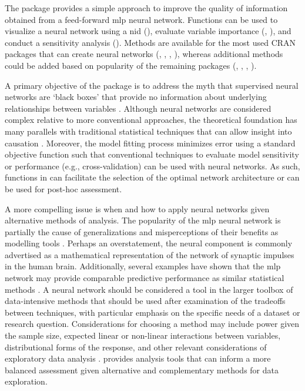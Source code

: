 \documentclass[article,shortnames]{jss}
\begin{document}
The  package provides a simple approach to improve the quality of information obtained from a feed-forward \ac{mlp} neural network.  Functions can be used to visualize a neural network using a \acl{nid} (), evaluate variable importance (, ), and conduct a sensitivity analysis ().  Methods are available for the most used \ac{CRAN} packages that can create neural networks (, , , ), whereas additional methods could be added based on popularity of the remaining packages (, , , ).  

A primary objective of the package is to address the myth that supervised neural networks are `black boxes' that provide no information about underlying relationships between variables \citep{Paruelo97,Olden02}.  Although neural networks are considered complex relative to more conventional approaches, the theoretical foundation has many parallels with traditional statistical techniques that can allow insight into causation \citep{Cheng94}.  Moreover, the model fitting process minimizes error using a standard objective function such that conventional techniques to evaluate model sensitivity or performance (e.g., cross-validation) can be used with neural networks.  As such, functions in  can facilitate the selection of the optimal network architecture or can be used for post-hoc assessment. 

A more compelling issue is when and how to apply neural networks given alternative methods of analysis.  The popularity of the \ac{mlp} neural network is partially the cause of generalizations and misperceptions of their benefits as modelling tools \citep{Burke97}. Perhaps an overstatement, the neural component is commonly advertised as a mathematical representation of the network of synaptic impulses in the human brain.  Additionally, several examples have shown that the \ac{mlp} network may provide comparable predictive performance as similar statistical methods \citep{Feng02,Razi05,Beck14a}.  A neural network should be considered a tool in the larger toolbox of data-intensive methods that should be used after examination of the tradeoffs between techniques, with particular emphasis on the specific needs of a dataset or research question.  Considerations for choosing a method may include power given the sample size, expected linear or non-linear interactions between variables, distributional forms of the response, and other relevant considerations of exploratory data analysis \citep{Zuur10}.   provides analysis tools that can inform a more balanced assessment given alternative and complementary methods for data exploration.
\end{document}

